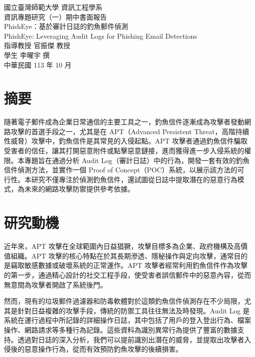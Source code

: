 \documentclass[a4paper,12pt]{article}
\begin{document}
\begin{titlepage}
\begin{center}
\vspace*{2cm}
{\fontsize{16pt}{16pt}\selectfont 國立臺灣師範大學 資訊工程學系}\\[1cm]
{\fontsize{16pt}{16pt} 資訊專題研究（一）期中書面報告}\\[4cm]
{\fontsize{16pt}{16pt}\selectfont PhishEye：基於審計日誌的釣魚郵件偵測}\\[1cm]
{\fontsize{16pt}{16pt}\selectfont PhishEye: Leveraging Audit Logs for Phishing Email Detections}\\[9cm]
{\fontsize{12pt}{12pt}\selectfont 指導教授 官振傑 教授}\\[0.5cm]
{\fontsize{12pt}{12pt}\selectfont 學生 李曜宇 撰}\\[0.5cm]
{\fontsize{12pt}{12pt}\selectfont 中華民國 113 年 10 月}
\end{center}
\end{titlepage}

\newpage

\section*{摘要}
隨著電子郵件成為企業日常通信的主要工具之一，釣魚信件逐漸成為攻擊者發動網路攻擊的首選手段之一，尤其是在 APT（Advanced Persistent Threat，高階持續性威脅）攻擊中，釣魚信件是其常見的入侵起點。APT 攻擊者通過釣魚信件騙取受害者的信任，讓其打開惡意附件或點擊惡意鏈接，進而獲得進一步入侵系統的權限。本專題旨在通過分析 Audit Log（審計日誌）中的行為，開發一套有效的釣魚信件偵測方法，並實作一個 Proof of Concept（POC）系統，以展示該方法的可行性。本研究不僅專注於偵測釣魚信件，還試圖從日誌中提取潛在的惡意行為模式，為未來的網路攻擊防禦提供參考依據。

\section{研究動機}
近年來，APT 攻擊在全球範圍內日益猖獗，攻擊目標多為企業、政府機構及高價值組織。APT 攻擊的核心特點在於其長期滲透、隱秘操作與定向攻擊，通常目的是竊取敏感數據或破壞系統的正常運作。APT 攻擊者經常利用釣魚信件作為攻擊的第一步，通過精心設計的社交工程手段，使受害者誤信郵件中的惡意內容，從而無意間為攻擊者開啟了系統後門。

然而，現有的垃圾郵件過濾器和防毒軟體對於這類釣魚信件偵測存在不少局限，尤其是針對日益複雜的攻擊手段，傳統的防禦工具往往無法及時發現。Audit Log 是系統在運行過程中所記錄的詳細操作日誌，其中包括了用戶的登入登出行為、檔案操作、網路請求等多種行為記錄。這些資料為識別異常行為提供了豐富的數據支持。透過對日誌的深入分析，我們可以提前識別出潛在的威脅，並提取出攻擊者入侵後的惡意操作行為，從而有效預防釣魚攻擊的後續損害。
\end{document}
